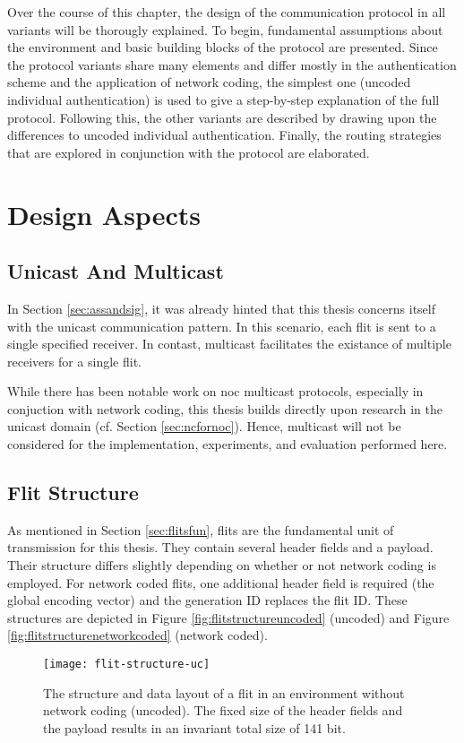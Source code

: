 Over the course of this chapter, the design of the communication protocol in all variants will be thorougly explained. To begin, fundamental
assumptions about the environment and basic building blocks of the protocol are presented. Since the protocol variants share many elements and differ
mostly in the authentication scheme and the application of network coding, the simplest one (uncoded individual authentication) is used to give a
step-by-step explanation of the full protocol. Following this, the other variants are described by drawing upon the differences to uncoded individual
authentication. Finally, the routing strategies that are explored in conjunction with the protocol are elaborated.

\section{Design Aspects}
\subsection{Unicast And Multicast}
In Section \ref{sec:assandsig}, it was already hinted that this thesis concerns itself with the unicast communication pattern. In this scenario, each
flit is sent to a single specified receiver. In contast, multicast facilitates the existance of multiple receivers for a single flit.

While there has been notable work on \gls{noc} multicast protocols, especially in conjuction with network coding, this thesis builds directly upon
research in the unicast domain (cf. Section \ref{sec:ncfornoc}). Hence, multicast will not be considered for the implementation, experiments, and
evaluation performed here.

\subsection{Flit Structure}\label{subsec:flitstructure}
As mentioned in Section \ref{sec:flitsfun}, flits are the fundamental unit of transmission for this thesis. They contain several header fields and a
payload. Their structure differs slightly depending on whether or not network coding is employed. For network coded flits, one additional
header field is required (the global encoding vector) and the generation ID replaces the flit ID. These structures are depicted in Figure
\vref{fig:flitstructureuncoded} (uncoded) and Figure \ref{fig:flitstructurenetworkcoded} (network coded).

\begin{figure}
    \centering
    \texttt{[image: flit-structure-uc]}
    \caption[The structure of a flit without network coding]{The structure and data layout of a flit in an environment without network coding
    (uncoded). The fixed size of the header fields and the payload results in an invariant total size of 141 bit.}
    \label{fig:flitstructureuncoded}
\end{figure}

